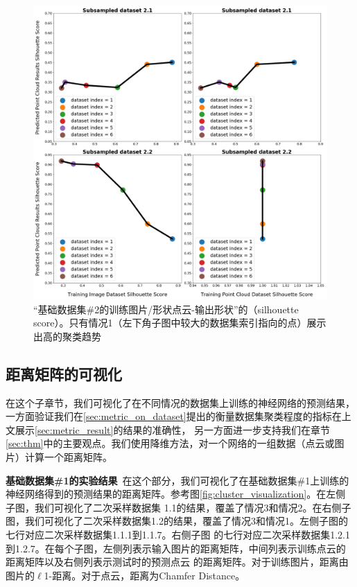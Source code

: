 \documentclass[bachelor, nocolorlinks, printoneside]{seuthesis} %
\begin{document}
\begin{Main}
\begin{figure}[h!]
    \centering
    \includegraphics[width=.95\textwidth]{figs/silhouette-dataset-2.png}
    \caption{\small “基础数据集\#2的训练图片/形状点云-输出形状”的（silhouette score）。只有情况1（左下角子图中较大的数据集索引指向的点）展示出高的聚类趋势}
    \label{fig:silhouette-dataset-2.png}
\end{figure}

\subsection{距离矩阵的可视化}
在这个子章节，我们可视化了在不同情况的数据集上训练的神经网络的预测结果，一方面验证我们在\ref{sec:metric_on_dataset}提出的衡量数据集聚类程度的指标在上文展示\ref{sec:metric_result}的结果的准确性，
另一方面进一步支持我们在章节\ref{sec:thm}中的主要观点。我们使用降维方法，对一个网络的一组数据（点云或图片）计算一个距离矩阵。

\textbf{基础数据集\#1的实验结果}~在这个部分，我们可视化了在基础数据集\#1上训练的神经网络得到的预测结果的距离矩阵。参考图\ref{fig:cluster_visualization}。在左侧子图，我们可视化了二次采样数据集
1.1的结果，覆盖了情况3和情况2。在右侧子图，我们可视化了二次采样数据集1.2的结果，覆盖了情况3和情况1。左侧子图的七行对应二次采样数据集1.1.1到1.1.7。右侧子图
的七行对应二次采样数据集1.2.1到1.2.7。在每个子图，左侧列表示输入图片的距离矩阵，中间列表示训练点云的距离矩阵以及右侧列表示测试时的预测点云
的距离矩阵。对于训练图片，距离由图片的$\ell$1-距离。对于点云，距离为Chamfer Distance。


\end{Main}
\end{document}
